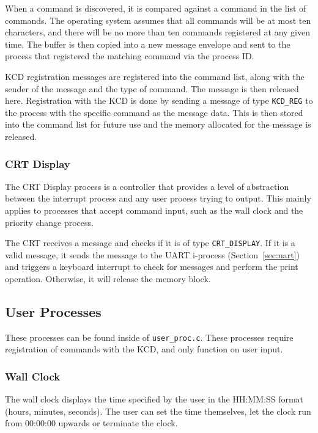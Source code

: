 \documentclass[se]{uw-wkrpt}
\begin{document}
When a command is discovered, it is compared against a command in the list of commands. The operating system assumes that all commands will be at most ten characters, and there will be no more than ten commands registered at any given time. The buffer is then copied into a new message envelope and sent to the process that registered the matching command via the process ID.

KCD registration messages are registered into the command list, along with the sender of the message and the type of command. The message is then released here. Registration with the KCD is done by sending a message of type \texttt{KCD\_REG} to the process with the specific command as the message data. This is then stored into the command list for future use and the memory allocated for the message is released.


\subsubsection{CRT Display}

The CRT Display process is a controller that provides a level of abstraction between the interrupt process and any user process trying to output. This mainly applies to processes that accept command input, such as the wall clock and the priority change process. 

The CRT receives a message and checks if it is of type \texttt{CRT\_DISPLAY}. If it is a valid message, it sends the message to the UART i-process (Section~\ref{sec:uart}) and triggers a keyboard interrupt to check for messages and perform the print operation. Otherwise, it will release the memory block.

\subsection{User Processes}

These processes can be found inside of \texttt{user\_proc.c}. These processes require registration of commands with the KCD, and only function on user input.

\subsubsection{Wall Clock}

The wall clock displays the time specified by the user in the HH:MM:SS format (hours, minutes, seconds). The user can set the time themselves, let the clock run from 00:00:00 upwards or terminate the clock.
\end{document}
